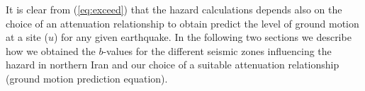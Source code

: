It is clear from (\ref{eq:exceed}) that the hazard calculations depends also on the choice of an attenuation relationship to obtain predict the level of ground motion at a site ($u$) for any given earthquake. In the following two sections we describe how we obtained the $b$-values for the different seismic zones influencing the hazard in northern Iran and our choice of a suitable attenuation relationship (ground motion prediction equation).










